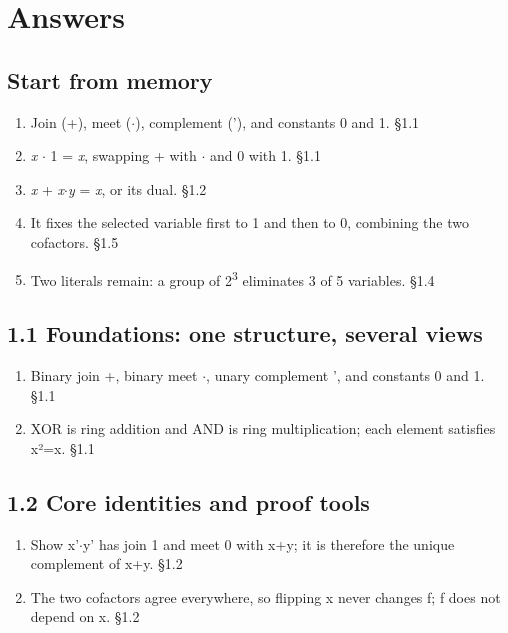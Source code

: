 \documentclass[11pt]{article}
\begin{document}
\clearpage
\section{Answers}
\begin{keepsection}\subsection{Start from memory}

\begin{enumerate}
\item Join (+), meet (\ensuremath{\cdot}), complement ('), and constants 0 and 1. \hfill{\small\color{FAUblue}§1.1}
\item \textit{x} \ensuremath{\cdot} 1 = \textit{x}, swapping + with \ensuremath{\cdot} and 0 with 1. \hfill{\small\color{FAUblue}§1.1}
\item \textit{x} + \textit{x}\ensuremath{\cdot}\textit{y} = \textit{x}, or its dual. \hfill{\small\color{FAUblue}§1.2}
\item It fixes the selected variable first to 1 and then to 0, combining the two cofactors. \hfill{\small\color{FAUblue}§1.5}
\item Two literals remain: a group of 2\textsuperscript{3} eliminates 3 of 5 variables. \hfill{\small\color{FAUblue}§1.4}
\end{enumerate}

\end{keepsection}
\begin{keepsection}\subsection{1.1 Foundations: one structure, several views}

\begin{enumerate}
\item Binary join +, binary meet \ensuremath{\cdot}, unary complement ', and constants 0 and 1. \hfill{\small\color{FAUblue}§1.1}
\item XOR is ring addition and AND is ring multiplication; each element satisfies x²=x. \hfill{\small\color{FAUblue}§1.1}
\end{enumerate}

\end{keepsection}
\begin{keepsection}\subsection{1.2 Core identities and proof tools}

\begin{enumerate}
\item Show x'\ensuremath{\cdot}y' has join 1 and meet 0 with x+y; it is therefore the unique complement of x+y. \hfill{\small\color{FAUblue}§1.2}
\item The two cofactors agree everywhere, so flipping x never changes f; f does not depend on x. \hfill{\small\color{FAUblue}§1.2}
\end{enumerate}

\end{keepsection}
\end{document}
